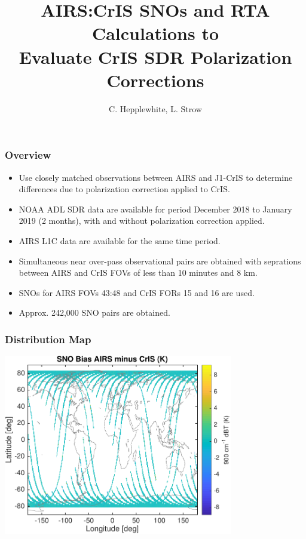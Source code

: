 \documentclass[10pt,t]{beamer} \usepackage[utf8]{inputenc}
\title[]{AIRS:CrIS SNOs and RTA Calculations to \\Evaluate CrIS SDR 
Polarization Corrections}
\author{C. Hepplewhite, L. Strow}
\newcommand{\cris}{\textsf{CrIS}\xspace}
\newcommand{\airs}{\textsf{AIRS}\xspace}
\begin{document}
\begin{frame}
  \titlepage
\end{frame}
\begin{frame}
  \frametitle{Overview}

  \begin{itemize}
  \item Use closely matched observations between \airs and J1-\cris to
    determine differences due to polarization correction applied to \cris.
  \item NOAA ADL SDR data are available for period December 2018 to January
    2019 (2 months), with and without polarization correction applied.
  \item \airs L1C data are available for the same time period.
  \item Simultaneous near over-pass observational pairs are obtained with
    seprations between \airs and \cris FOVs of less than 10 minutes and 8 km.
  \item SNOs for \airs FOVs 43:48 and \cris FORs 15 and 16 are used.
  \item Approx. 242,000 SNO pairs are obtained.
  \end{itemize}

\end{frame}
\begin{frame}
  \frametitle{Distribution Map}
  \begin{center}
    \noindent\includegraphics[width=0.75\textwidth]{Figs/sno_airs_cris2_bias_map.pdf}
  \end{center}
\end{frame}
\end{document}
